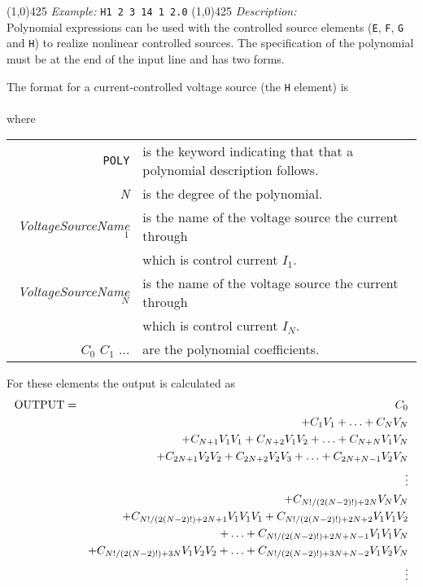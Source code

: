 \newline
\linethickness{0.5mm} \line(1,0){425}
\newline
\textit{Example:}
\newline
\texttt{H1 2 3 14 1 2.0}
\newline
\linethickness{0.5mm} \line(1,0){425}
\newline
\textit{Description:}\\
Polynomial expressions can be used with the controlled source
elements ({\tt E}, {\tt F}, {\tt G} and {\tt H}) to realize
nonlinear controlled sources. The specification of the polynomial
must be at the end of the input line and has two forms.

The format for a current-controlled voltage source (the {\tt H}
element) is\\[0.1in]
\hspace*{\fill}\\
where
\newline
\begin{tabular}{r l}
{\tt POLY} & is the keyword indicating that that a polynomial
description follows.\\
{\it N} & is the degree of the polynomial.\\
{\it VoltageSourceName$_1$} & is the name of the voltage source
the current through\\
& which is control current $I_1$.\\
{\it VoltageSourceName$_N$} & is the name of the voltage source
the current through\\
& which is control current $I_N$.\\
$C_0$ $C_1$ $\ldots$ & are the polynomial coefficients.
\end{tabular}

For these elements the output is calculated as
\begin{eqnarray}
{\rm OUTPUT} & = & C_0 \nonumber\\
         &   & + C_1V_1 + \ldots + C_NV_N\nonumber\\
         &   & + C_{N+1}V_1V_1 + C_{N+2}V_1V_2 + \ldots + C_{N+N}V_1V_N
             \nonumber\\
         &   & + C_{2N+1}V_2V_2 + C_{2N+2}V_2V_3 +\ldots + C_{2N+N-1}V_2V_N
             \nonumber\\
         &   & \vdots
             \nonumber\\
         &   & + C_{N!/(2(N-2)!)+2N}V_NV_N
             \nonumber\\
         &   & + C_{N!/(2(N-2)!)+2N+1}V_1V_1V_1 +
               C_{N!/(2(N-2)!)+2N+2}V_1V_1V_2\\
         &   & \ \ \ \ \ \ \ + \ldots +
               C_{N!/(2(N-2)!)+2N+N-1}V_1V_1V_N
                   \nonumber\\
         &   & + C_{N!/(2(N-2)!)+3N}V_1V_2V_2 + \ldots +
               C_{N!/(2(N-2)!)+3N+N-2}V_1V_2V_N
                   \nonumber\\
         &   & \vdots
\end{eqnarray}

